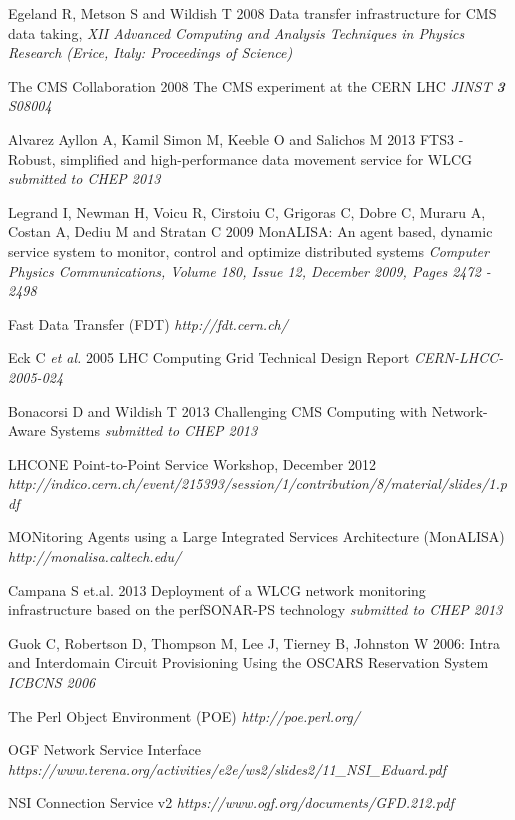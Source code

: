 \begin{thebibliography}{1}

 Egeland R, Metson S and Wildish T 2008 Data transfer infrastructure for CMS data taking,  {\it XII Advanced Computing and Analysis Techniques in Physics Research (Erice, Italy: Proceedings of Science)}

 The CMS Collaboration 2008 The CMS experiment at the CERN LHC {\it JINST {\bf 3} S08004}

 Alvarez Ayllon A, Kamil Simon M, Keeble O and Salichos M 2013 FTS3 - Robust, simplified and high-performance data movement service for WLCG {\it submitted to CHEP 2013}

 Legrand I, Newman H, Voicu R, Cirstoiu C, Grigoras C, Dobre C, Muraru A, Costan A, Dediu M and Stratan C 2009 MonALISA: An agent based, dynamic service system to monitor, control and optimize distributed systems {\it Computer Physics Communications, Volume 180, Issue 12, December 2009, Pages 2472 - 2498}

 Fast Data Transfer (FDT) {\it http://fdt.cern.ch/}

 Eck C {\it et al.} 2005 LHC Computing Grid Technical Design Report {\it CERN-LHCC-2005-024}

 Bonacorsi D and Wildish T 2013 Challenging CMS Computing with Network-Aware Systems {\it submitted to CHEP 2013}

 LHCONE Point-to-Point Service Workshop, December 2012 
 {\it 	http://indico.cern.ch/event/215393/session/1/contribution/8/material/slides/1.pdf}
 

 MONitoring Agents using a Large Integrated Services Architecture (MonALISA) {\it http://monalisa.caltech.edu/}

  Campana S et.al. 2013 Deployment of a WLCG network monitoring infrastructure based on the perfSONAR-PS technology {\it submitted to CHEP 2013}

  Guok C, Robertson D, Thompson M, Lee J, Tierney B, Johnston W 2006: Intra and Interdomain Circuit Provisioning Using the OSCARS Reservation System {\it ICBCNS 2006}

 The Perl Object Environment (POE) {\it http://poe.perl.org/}

 OGF Network Service Interface {\it https://www.terena.org/activities/e2e/ws2/slides2/11\_NSI\_Eduard.pdf}
 
 NSI Connection Service v2 {\it https://www.ogf.org/documents/GFD.212.pdf}
 
\end{thebibliography}
